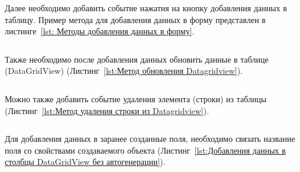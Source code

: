 \documentclass[12pt]{article}
\newcommand{\colorGIT}[1]{\textcolor{CtpLavender}{#1}}
\renewcommand{\texttt}[1]{{\small\ttfamily #1}}
\newenvironment{code}
  {\par\captionsetup{type=listing}\noindent}
  {\par\vspace{\baselineskip}}
\numberwithin{listing}{section}
\numberwithin{figure}{section}
\begin{document}
Далее необходимо добавить событие нажатия на кнопку добавления данных в таблицу. Пример метода для добавления данных в форму представлен в листинге~\ref{lst: Методы добавления данных в форму}.

\begin{code}
	\inputminted[firstline = 165, lastline=200]{csharp}{../2lab/WinFormsApp1example_/Form1.cs}
	\caption{\colorGIT{\href{https://github.com/WebMasterIT/Csharp_Labs/blob/c79e983c4cab3c416e44b6d5f9854b292fdeae26/2lab/WinFormsApp1example_/Form1.cs\#L165-L200}{Метод}} добавления данных в форму}
	\label{lst: Методы добавления данных в форму}
\end{code}

Также необходимо после добавления данных обновить данные в таблице (\texttt{DataGridView}) (Листинг~\ref{lst:Метод обновления Datagridview}).

\begin{code}
	\inputminted[firstline = 234, lastline=277]{csharp}{../2lab/WinFormsApp1example_/Form1.cs}
	\caption{\colorGIT{\href{https://github.com/WebMasterIT/Csharp_Labs/blob/c79e983c4cab3c416e44b6d5f9854b292fdeae26/2lab/WinFormsApp1example_/Form1.cs\#L234-L277}{Метод}} обновления \texttt{DataGridView}}
	\label{lst:Метод обновления Datagridview}
\end{code}


Можно также добавить событие удаления элемента (строки) из таблицы (Листинг~\ref{lst:Метод удаления строки из Datagridview}).

\begin{code}
	\inputminted[firstline = 346, lastline=363]{csharp}{../2lab/WinFormsApp1example_/Form1.cs}
	\caption{\colorGIT{\href{https://github.com/WebMasterIT/Csharp_Labs/blob/c79e983c4cab3c416e44b6d5f9854b292fdeae26/2lab/WinFormsApp1example_/Form1.cs\#L346-L363}{Метод}} удаления строки из \texttt{DataGridView}}
	\label{lst:Метод удаления строки из Datagridview}
\end{code}

Для добавления данных в заранее созданные поля, необходимо связать название поля со свойствами создаваемого объекта (Листинг~\ref{lst:Добавления данных в столбцы DataGridView без автогенерации}).

\begin{code}
	\inputminted[firstline=146, lastline=163]{csharp}{../2lab/WinFormsApp1example_/Form1.cs}
	\caption{\colorGIT{\href{https://github.com/WebMasterIT/Csharp_Labs/blob/c79e983c4cab3c416e44b6d5f9854b292fdeae26/2lab/WinFormsApp1example_/Form1.cs\#L146-L163}{Добавление}} данных в столбцы \texttt{DataGridView} без автогенерации}
	\label{lst:Добавления данных в столбцы DataGridView без автогенерации}
\end{code}
\end{document}
